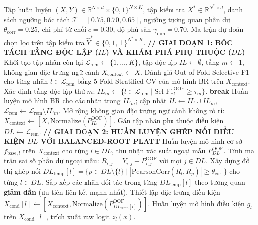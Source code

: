 \documentclass[10pt,a4paper,twoside]{article}
\begin{document}
\begin{algorithm}[H]
\caption{Quy trình Huấn luyện và Suy diễn Chọn lọc Toàn diện GSI-MLC-PA v6.3.1}
\label{alg:v631}
\begin{algorithmic}[1]
\Require Tập huấn luyện $(X, Y) \in \mathbb{R}^{N \times d} \times \{0, 1\}^{N \times K}$, tập kiểm tra $X^* \in \mathbb{R}^{N^* \times d}$, danh sách ngưỡng bóc tách $\mathcal{T} = [0.75, 0.70, 0.65]$, ngưỡng tương quan phần dư $\theta_{\text{corr}} = 0.25$, chi phí từ chối $c=0.30$, độ phủ sàn $\gamma_{\min}=0.70$.
\Ensure Ma trận dự đoán chọn lọc trên tập kiểm tra $\hat{Y}^* \in \{0, 1, \bot\}^{N^* \times K}$.
\Statex \textbf{// GIAI ĐOẠN 1: BÓC TÁCH TẦNG ĐỘC LẬP ($IL$) VÀ KHÁM PHÁ PHỤ THUỘC ($DL$)}
\State Khởi tạo tập nhãn còn lại $\mathcal{L}_{\text{rem}} \gets \{1, \dots, K\}$, tập độc lập $IL \gets \emptyset$, tầng $m \gets 1$, không gian đặc trưng ngữ cảnh $X_{\text{context}} \gets X$.
    \State Đánh giá Out-of-Fold Selective-F1 cho từng nhãn $l \in \mathcal{L}_{\text{rem}}$ bằng 5-Fold Stratified CV của mô hình BR trên $X_{\text{context}}$.
    \State Xác định tầng độc lập thứ $m$: $IL_m \gets \{l \in \mathcal{L}_{\text{rem}} \mid \text{Sel-F1}_l^{\text{OOF}} \ge \tau_m\}$.
     \State \textbf{break}  \EndIf
    \State Huấn luyện mô hình BR cho các nhãn trong $IL_m$; cập nhật $IL \gets IL \cup IL_m$, $\mathcal{L}_{\text{rem}} \gets \mathcal{L}_{\text{rem}} \setminus IL_m$.
    \State Mở rộng không gian đặc trưng ngữ cảnh không rò rỉ: $X_{\text{context}} \gets [X, \text{Normalize}(P^{\text{OOF}}_{IL})]$.
\EndFor
\State Gán tập nhãn phụ thuộc điều kiện $DL \gets \mathcal{L}_{\text{rem}}$.
\Statex \textbf{// GIAI ĐOẠN 2: HUẤN LUYỆN GHÉP NỐI ĐIỀU KIỆN $DL$ VỚI BALANCED-ROOT PLATT}
\State Huấn luyện mô hình cơ sở $f_{\text{base}, l}$ trên $X_{\text{context}}$ cho từng $l \in DL$, thu nhận xác suất ngoại mẫu $P^{\text{OOF}}_{DL}$.
\State Tính ma trận sai số phần dư ngoại mẫu: $R_{i, j} = Y_{i, j} - P^{\text{OOF}}_{i, j}$ với mọi $j \in DL$.
\State Xây dựng đồ thị ghép nối $DL_{\text{temp}}[l] = \{p \in DL \setminus \{l\} \mid |\text{PearsonCorr}(R_l, R_p)| \ge \theta_{\text{corr}}\}$ cho từng $l \in DL$.
\State Sắp xếp các nhãn đối tác trong từng $DL_{\text{temp}}[l]$ theo tương quan \textbf{giảm dần} (ưu tiên liên kết mạnh nhất).
    \State Thiết lập đặc trưng điều kiện $X_{\text{cond}}[l] \gets [X_{\text{context}}, \text{Normalize}(P^{\text{OOF}}_{DL_{\text{temp}}[l]})]$.
    \State Huấn luyện mô hình điều kiện $g_l$ trên $X_{\text{cond}}[l]$, trích xuất raw logit $z_l(x)$.

\end{algorithmic}
\end{algorithm}
\end{document}

